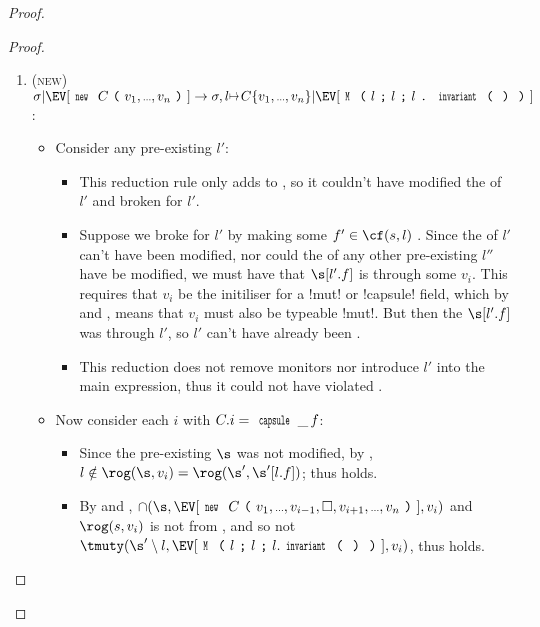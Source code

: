 \begin{proof}
\begin{proof}
\begin{enumerate}
\item (\textsc{new}) $\sigma|\EV[\Kw{new}\ C\oR v_1,\ldots,v_n\cR]\rightarrow \sigma,l\mapsto C\{v_1,\ldots,v_n\}| \EV[\M{l}{l}{l\singleDot\invariant}]$:
\begin{itemize}
	\item Consider any pre-existing $l'$:
	\begin{itemize}
		\item This reduction rule only adds to \s, so it couldn't have modified the \rog of $l'$ and broken \CNC for $l'$.
		\item Suppose we broke \CNE for $l'$ by making some $f' \in \cf(s, l)$ \tmuty. Since the \rog of $l'$ can't have been modified, nor could the \rog of any other pre-existing $l''$ have be modified, we must have that $\s[l'.f]$ is \tmuty through some $v_i$. This requires that $v_i$ be the initiliser for a \Q!mut! or \Q!capsule! field, which by  and , means that $v_i$ must also be typeable \Q!mut!. But then the $\s[l'.f]$ was \tmuty through $l'$, so $l'$ can't have already been \CNE.
		\item This reduction does not remove monitors nor introduce $l'$ into the main expression, thus it could not have violated \CNO.
	\end{itemize}
	\item Now consider each $i$ with $C.i = \Kw{capsule}\,\_\,f$:
	\begin{itemize}
	\item Since the pre-existing $\s$ was not modified, by \VS, $l \notin \rog(\s, v_i) = \rog(\s', \s'[l.f])$; thus \CNC holds.
	\item By  and , $\cap(\s, \EV[\Kw{new}\ C\oR v_1,\ldots,v_{i-1},\square,v_{i+1},\ldots,v_n\cR], v_i)$ and $\rog(s, v_i)$ is not \tmuty from \EV, and so not $\tmuty(\s'\setminus l, \EV[\M{l}{l}{l.\invariant}], v_i)$, thus \CNE holds.
	\end{itemize}
\end{itemize}



\end{enumerate}
\end{proof}
\end{proof}
